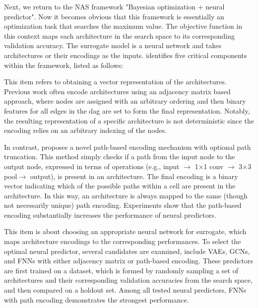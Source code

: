 Next, we return to the NAS framework "Bayesian optimization + neural predictor". Now it becomes obvious that this framework is essentially an optimization task that searches the maximum value. The objective function in this context maps each architecture in the search space to its corresponding validation accuracy. The surrogate model is a neural network and takes architectures or their encodings as the inputs. \cite{white2019bananas} identifies five critical components within the framework, listed as follows:

\begin{description}[leftmargin=0cm, listparindent=\parindent]
	\item [Architecture Encoding] This item refers to obtaining a vector representation of the architectures. Previous work often encode architectures using an adjacency matrix based approach, where nodes are assigned with an arbitrary ordering  and then binary features for all edges in the \gls{dag} are set to form the final representation.	Notably, the resulting representation of a specific architecture is not deterministic since the encoding  relies on an arbitrary indexing of the nodes. 
 
	In contrast, \cite{white2019bananas} proposes a novel path-based encoding mechanism with optional path truncation. This method simply checks if a path from the input node to the output node, expressed in terms of operations (e.g., input $\rightarrow$ 1$\times$1 conv $\rightarrow$ 3$\times$3 pool$\rightarrow$ output), is present in an architecture. The final encoding is a binary vector indicating which of the possible paths within a cell are present in the architecture. In this way, an architecture is always mapped to the same (though not necessarily unique) path encoding. Experiments show that the path-based encoding substantially increases the performance of neural predictors.
	
	\item [Neural Predictor] This item is about choosing an appropriate neural network for surrogate, which maps architecture encodings to the corresponding performances. To select the optimal neural predictor, several candidates are examined, include VAEs, GCNs, and FNNs with either adjacency matrix or path-based encoding. These predictors are first trained on a dataset, which is formed by randomly sampling a set of architectures and their corresponding validation accuracies from the search space, and then compared on a holdout set. Among all tested neural predictors, FNNs with path encoding demonstrates the strongest performance.
	 

\end{description}
